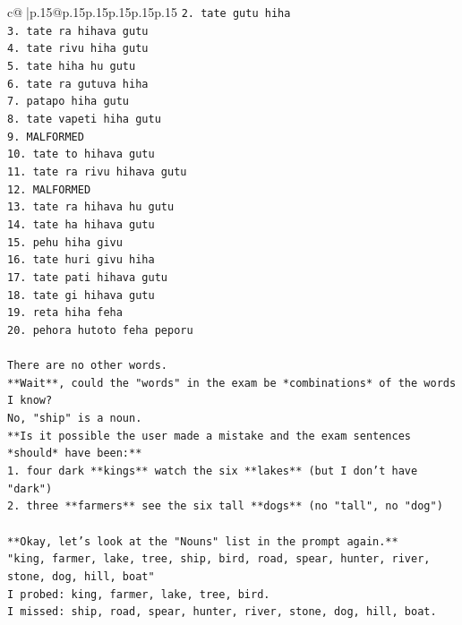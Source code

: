 \documentclass{article}
\begin{document}
{\begin{supertabular}{c@{$\;$}|p{.15\linewidth}@{}p{.15\linewidth}p{.15\linewidth}p{.15\linewidth}p{.15\linewidth}p{.15\linewidth}}
{{{\texttt{2. tate gutu hiha} \\
\texttt{3. tate ra hihava gutu} \\
\texttt{4. tate rivu hiha gutu} \\
\texttt{5. tate hiha hu gutu} \\
\texttt{6. tate ra gutuva hiha} \\
\texttt{7. patapo hiha gutu} \\
\texttt{8. tate vapeti hiha gutu} \\
\texttt{9. MALFORMED} \\
\texttt{10. tate to hihava gutu} \\
\texttt{11. tate ra rivu hihava gutu} \\
\texttt{12. MALFORMED} \\
\texttt{13. tate ra hihava hu gutu} \\
\texttt{14. tate ha hihava gutu} \\
\texttt{15. pehu hiha givu} \\
\texttt{16. tate huri givu hiha} \\
\texttt{17. tate pati hihava gutu} \\
\texttt{18. tate gi hihava gutu} \\
\texttt{19. reta hiha feha} \\
\texttt{20. pehora hutoto feha peporu} \\
\\ 
\texttt{There are no other words.} \\
\texttt{**Wait**, could the "words" in the exam be *combinations* of the words I know?} \\
\texttt{No, "ship" is a noun.} \\
\texttt{**Is it possible the user made a mistake and the exam sentences *should* have been:**} \\
\texttt{1. four dark **kings** watch the six **lakes** (but I don't have "dark")} \\
\texttt{2. three **farmers** see the six tall **dogs** (no "tall", no "dog")} \\
\\ 
\texttt{**Okay, let's look at the "Nouns" list in the prompt again.**} \\
\texttt{"king, farmer, lake, tree, ship, bird, road, spear, hunter, river, stone, dog, hill, boat"} \\
\texttt{I probed: king, farmer, lake, tree, bird.} \\
\texttt{I missed: ship, road, spear, hunter, river, stone, dog, hill, boat.} \\
}}}
\end{supertabular}}
\end{document}
